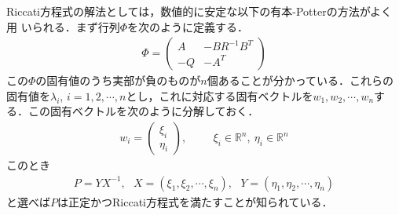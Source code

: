Riccati方程式の解法としては，数値的に安定な以下の有本-Potterの方法がよく用
いられる．まず行列$\Phi$を次のように定義する．
\begin{align}
 \Phi = \left(\begin{array}{cc}
	       A  & - B R^{-1} B^T \\
	       -Q & - A^T
	      \end{array}\right)
\end{align}
この$\Phi$の固有値のうち実部が負のものが$n$個あることが分かっている．これらの固有値を$\lambda_i$, $i=1,2,\cdots,n$とし，これに対応する固有ベクトルを$w_1, w_2, \cdots, w_n$する．この固有ベクトルを次のように分解しておく．
\begin{align}
 w_i = \left(\begin{array}{c}
	      \xi_i \\
	      \eta_i
	     \end{array}\right), \hspace{1cm} \xi_i \in {\mathbb R}^n, \ \eta_i \in {\mathbb R}^n
\end{align}
このとき
\begin{align}
	P = Y X^{-1}, \ \ \ 
	X = (\xi_1, \xi_2, \cdots, \xi_n), \ \ \ 
	Y = (\eta_1, \eta_2, \cdots, \eta_n)
\end{align}
と選べば$P$は正定かつRiccati方程式を満たすことが知られている．

